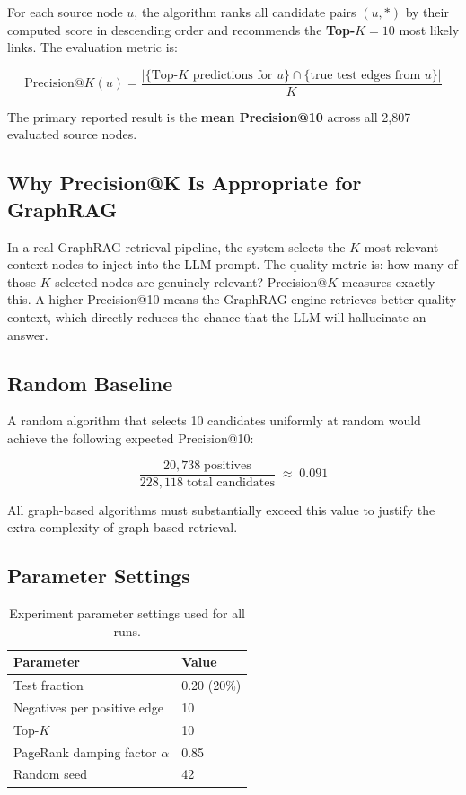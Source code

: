 \documentclass[10pt]{article}
\newcommand{\theadfont}{\bfseries\color{white}}
\begin{document}
For each source node $u$, the algorithm ranks all candidate pairs $(u, *)$ by their computed score in descending order and recommends the \textbf{Top-$K = 10$} most likely links. The evaluation metric is:

\begin{equation}
  \text{Precision@}K(u) = \frac{\bigl|\{\text{Top-}K \text{ predictions for } u\} \cap \{\text{true test edges from } u\}\bigr|}{K}
  \label{eq:precision}
\end{equation}

The primary reported result is the \textbf{mean Precision@10} across all 2,807 evaluated source nodes.

\subsection{Why Precision@K Is Appropriate for GraphRAG}

In a real GraphRAG retrieval pipeline, the system selects the $K$ most relevant context nodes to inject into the LLM prompt. The quality metric is: how many of those $K$ selected nodes are genuinely relevant? Precision@$K$ measures exactly this. A higher Precision@10 means the GraphRAG engine retrieves better-quality context, which directly reduces the chance that the LLM will hallucinate an answer.

\subsection{Random Baseline}

A random algorithm that selects 10 candidates uniformly at random would achieve the following expected Precision@10:

\[
\frac{20{,}738 \;\text{positives}}{228{,}118 \;\text{total candidates}} \;\approx\; 0.091
\]

All graph-based algorithms must substantially exceed this value to justify the extra complexity of graph-based retrieval.

\subsection{Parameter Settings}

\begin{table}[H]
  \centering
  \caption{Experiment parameter settings used for all runs.}
  \label{tab:params}
  \begin{tabular}{ll}
    \hline
    \rowcolor{brandblue}
    \theadfont Parameter & \theadfont Value \\
    \hline
    \rowcolor{lightblue}
    Test fraction                   & 0.20 (20\%) \\
    Negatives per positive edge     & 10 \\
    \rowcolor{lightblue}
    Top-$K$                         & 10 \\
    PageRank damping factor $\alpha$ & 0.85 \\
    \rowcolor{lightblue}
    Random seed                     & 42 \\
    \hline
  \end{tabular}
\end{table}
\end{document}
